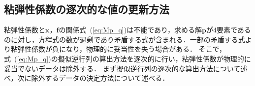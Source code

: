 \documentclass[a4paper]{jarticle}
\begin{document}
\subsection{粘弾性係数の逐次的な値の更新方法}\label{subsec:downsample}
粘弾性係数と$\boldsymbol{x}$，$\boldsymbol{f}$の関係式~(\ref{eq:Mp_q})は不能であり，求める解$\mathbf{p}$が4要素であるのに対し，方程式の数が過剰であり矛盾する式が含まれる．一部の矛盾する式より粘弾性係数が負になり，物理的に妥当性を失う場合がある．
そこで，式~(\ref{eq:Mp_q})の擬似逆行列の算出方法を逐次的に行い，粘弾性係数が物理的に妥当でないデータは除外する．
まず擬似逆行列の逐次的な算出方法について述べ，次に除外するデータの決定方法について述べる．
\end{document}

